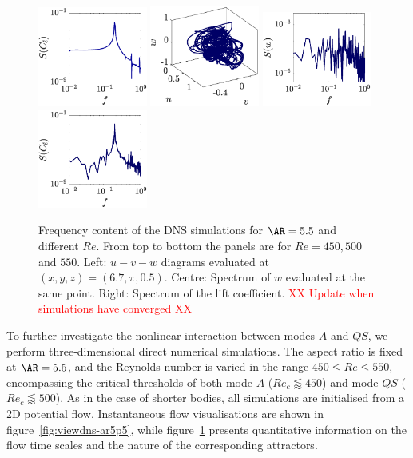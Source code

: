 \begin{figure}
  \includegraphics[width=0.32\textwidth]{./fig/AR5p5/cl_f_Re500.eps}
  \includegraphics[width=0.32\textwidth]{./fig/AR5p5/u-v-w_Re550.eps}
  \includegraphics[width=0.32\textwidth]{./fig/AR5p5/w_f_Re550.eps} 
  \includegraphics[width=0.32\textwidth]{./fig/AR5p5/cl_f_Re550.eps} 
  \caption{Frequency content of the DNS simulations for $\AR=5.5$ and different $Re$. From top to bottom the panels are for $Re=450,500$ and $550$. Left: $u-v-w$ diagrams evaluated at $(x,y,z) = (6.7,\pi,0.5)$. Centre: Spectrum of $w$ evaluated at the same point. Right: Spectrum of the lift coefficient. \textcolor{red}{XX Update when simulations have converged XX}}
  \label{fig:clcd-ar5p5}   
\end{figure}

To further investigate the nonlinear interaction between modes $A$ and $QS$, we perform three-dimensional direct numerical simulations. The aspect ratio is fixed at $\AR = 5.5$, and the Reynolds number is varied in the range $450 \le Re \le 550$, encompassing the critical thresholds of both mode $A$ ($Re_c \lessapprox 450$) and mode $QS$ ($Re_c \lessapprox 500$). As in the case of shorter bodies, all simulations are initialised from a 2D potential flow. Instantaneous flow visualisations are shown in figure~\ref{fig:viewdns-ar5p5}, while figure~\ref{fig:clcd-ar5p5} presents quantitative information on the flow time scales and the nature of the corresponding attractors.

